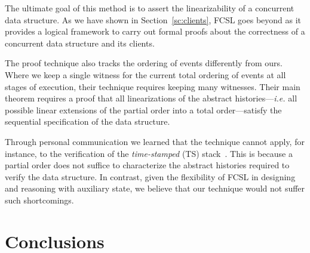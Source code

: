 \documentclass[a4paper,UKenglish]{lipics-v2016}
\newcommand{\ie}{\emph{i.e.}\xspace}
\theoremstyle{definition}
\begin{document}
The ultimate goal of this method is to assert the
linearizability of a concurrent data structure. As we have shown in
Section~\ref{sc:clients}, FCSL goes beyond as it provides a logical
framework to carry out formal proofs about the correctness of a
concurrent data structure and its clients.


The proof technique also tracks the ordering of events 
differently from ours. Where we keep a single witness for
the current total ordering of events at all stages of execution,
their technique requires keeping many witnesses. Their main theorem requires a
proof that all linearizations of the abstract histories---\ie all
possible linear extensions of the partial order into a total
order---satisfy the sequential specification of the data structure.


Through personal communication we learned that the
technique cannot apply, for instance, to the verification of the {\it
  time-stamped} (TS) stack~\cite{DoddsHK+POPL15}. This is because a
partial order does not suffice to characterize the abstract histories
required to verify the data structure.
%
In contrast, given the flexibility of FCSL in designing and reasoning
with auxiliary state, we believe that our technique would not suffer
such shortcomings.

%

\section{Conclusions}
\label{sec:conclusions}
\end{document}
